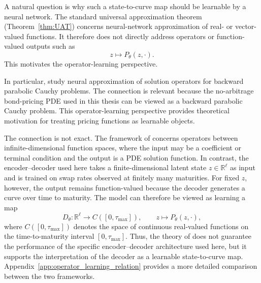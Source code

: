 
A natural question is why such a state-to-curve map should be learnable by a neural network. The standard universal approximation theorem (Theorem~\ref{thm:UAT}) concerns neural-network approximation of real- or vector-valued functions. It therefore does not directly address operators or function-valued outputs such as
\[
    z \mapsto P_\theta(z,\cdot).
\]
This motivates the operator-learning perspective. 



In particular, \citet{Benth2024} study neural approximation of solution operators for backward parabolic Cauchy problems. The connection is relevant because the no-arbitrage bond-pricing PDE used in this thesis can be viewed as a backward parabolic Cauchy problem. This operator-learning perspective provides theoretical motivation for treating pricing functions as learnable objects.

The connection is not exact. The framework of \citet{Benth2024} concerns operators between infinite-dimensional function spaces, where the input may be a coefficient or terminal condition and the output is a PDE solution function. In contrast, the encoder--decoder used here takes a finite-dimensional latent state \(z\in\mathbb{R}^{\ell}\) as input and is trained on swap rates observed at finitely many maturities. For fixed \(z\), however, the output remains function-valued because the decoder generates a curve over time to maturity. The model can therefore be viewed as learning a map
\[
    D_\theta:\mathbb{R}^{\ell}\to C([0,\tau_{\max}]),
    \qquad
    z\mapsto P_\theta(z,\cdot),
\]
where \(C([0,\tau_{\max}])\) denotes the space of continuous real-valued functions on the time-to-maturity interval \([0,\tau_{\max}]\). Thus, the theory of \citet{Benth2024} does not guarantee the performance of the specific encoder--decoder architecture used here, but it supports the interpretation of the decoder as a learnable state-to-curve map. Appendix~\ref{app:operator_learning_relation} provides a more detailed comparison between the two frameworks.


